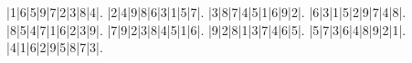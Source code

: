 \begin{sudoku}
|1|6|5|9|7|2|3|8|4|.
|2|4|9|8|6|3|1|5|7|.
|3|8|7|4|5|1|6|9|2|.
|6|3|1|5|2|9|7|4|8|.
|8|5|4|7|1|6|2|3|9|.
|7|9|2|3|8|4|5|1|6|.
|9|2|8|1|3|7|4|6|5|.
|5|7|3|6|4|8|9|2|1|.
|4|1|6|2|9|5|8|7|3|.
\end{sudoku}
